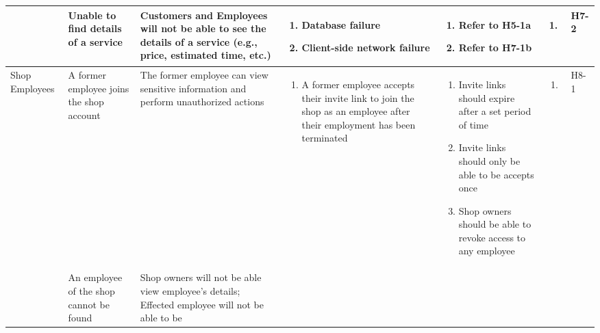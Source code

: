\documentclass{article}
\begin{document}
\begin{landscape}
\begin{longtable}{|p{}|p{}|p{}|p{}|p{}|p{}|p{}|}
		\cline{2-7}
		~
		 & Unable to find details of a service
		 & Customers and Employees will not be able to see the details of a service (e.g., price, estimated time, etc.)
		 & \begin{enumerate}[label=\alph*., leftmargin=*]
			   \item Database failure
			   \item Client-side network failure
		   \end{enumerate}
		 & \begin{enumerate}[label=\alph*., leftmargin=*]
			   \item Refer to H5-1a
			   \item Refer to H7-1b
		   \end{enumerate}
		 & \begin{enumerate}[label=\alph*., leftmargin=*]
			   \item
		   \end{enumerate}
		 & H7-2                                                                                                         \\
		\hline
		\multirow{2}{*}{Shop Employees}
		 & A former employee joins the shop account
		 & The former employee can view sensitive information and perform unauthorized actions
		 & \begin{enumerate}[label=\alph*., leftmargin=*]
			   \item A former employee accepts their invite link to join the shop as an employee after their employment
			         has been terminated
		   \end{enumerate}
		 & \begin{enumerate}[label=\alph*., leftmargin=*]
			   \item Invite links should expire after a set period of time
			   \item Invite links should only be able to be accepts once
			   \item Shop owners should be able to revoke access to any employee
		   \end{enumerate}
		 & \begin{enumerate}[label=\alph*., leftmargin=*]
			   \item
		   \end{enumerate}
		 & H8-1                                                                                                         \\
		\cline{2-7}
		~
		 & An employee of the shop cannot be found
		 & Shop owners will not be able view employee's details; Effected employee will not be able to be

\end{longtable}
\end{landscape}
\end{document}
